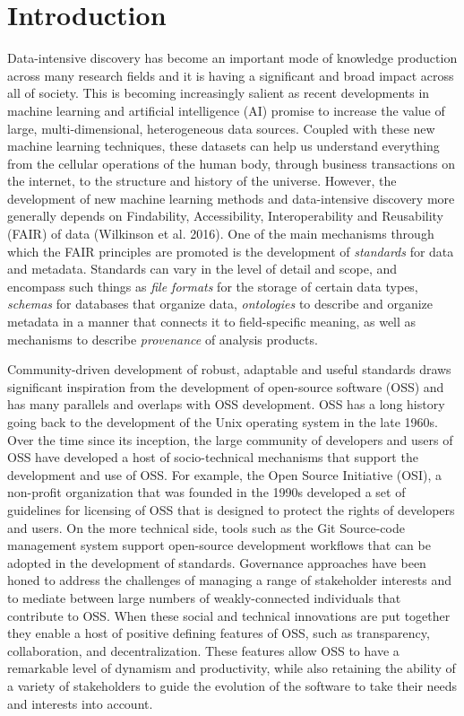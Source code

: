 \documentclass[
  letterpaper,
  DIV=11,
  numbers=noendperiod]{scrartcl}
\begin{document}
\section{Introduction}\label{sec-intro}

Data-intensive discovery has become an important mode of knowledge
production across many research fields and it is having a significant
and broad impact across all of society. This is becoming increasingly
salient as recent developments in machine learning and artificial
intelligence (AI) promise to increase the value of large,
multi-dimensional, heterogeneous data sources. Coupled with these new
machine learning techniques, these datasets can help us understand
everything from the cellular operations of the human body, through
business transactions on the internet, to the structure and history of
the universe. However, the development of new machine learning methods
and data-intensive discovery more generally depends on Findability,
Accessibility, Interoperability and Reusability (FAIR) of data
(Wilkinson et al. 2016). One of the main mechanisms through which the
FAIR principles are promoted is the development of \emph{standards} for
data and metadata. Standards can vary in the level of detail and scope,
and encompass such things as \emph{file formats} for the storage of
certain data types, \emph{schemas} for databases that organize data,
\emph{ontologies} to describe and organize metadata in a manner that
connects it to field-specific meaning, as well as mechanisms to describe
\emph{provenance} of analysis products.

Community-driven development of robust, adaptable and useful standards
draws significant inspiration from the development of open-source
software (OSS) and has many parallels and overlaps with OSS development.
OSS has a long history going back to the development of the Unix
operating system in the late 1960s. Over the time since its inception,
the large community of developers and users of OSS have developed a host
of socio-technical mechanisms that support the development and use of
OSS. For example, the Open Source Initiative (OSI), a non-profit
organization that was founded in the 1990s developed a set of guidelines
for licensing of OSS that is designed to protect the rights of
developers and users. On the more technical side, tools such as the Git
Source-code management system support open-source development workflows
that can be adopted in the development of standards. Governance
approaches have been honed to address the challenges of managing a range
of stakeholder interests and to mediate between large numbers of
weakly-connected individuals that contribute to OSS. When these social
and technical innovations are put together they enable a host of
positive defining features of OSS, such as transparency, collaboration,
and decentralization. These features allow OSS to have a remarkable
level of dynamism and productivity, while also retaining the ability of
a variety of stakeholders to guide the evolution of the software to take
their needs and interests into account.
\end{document}
